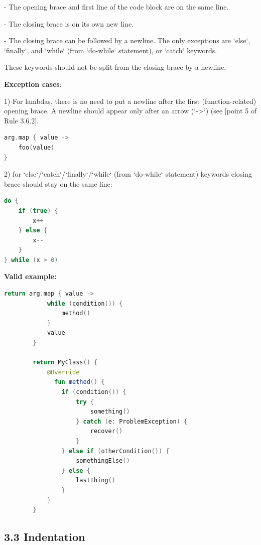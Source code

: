 - The opening brace and first line of the code block are on the same line.

- The closing brace is on its own new line.

- The closing brace can be followed by a newline. The only exceptions are `else`, `finally`, and `while` (from `do-while` statement), or `catch` keywords.

These keywords should not be split from the closing brace by a newline.



\textbf{Exception cases}:



1) For lambdas, there is no need to put a newline after the first (function-related) opening brace. A newline should appear only after an arrow (`->`) (see [point 5 of Rule 3.6.2].



\begin{lstlisting}[language=Kotlin]
arg.map { value ->
    foo(value)
}
\end{lstlisting}


2) for `else`/`catch`/`finally`/`while` (from `do-while` statement) keywords closing brace should stay on the same line:

\begin{lstlisting}[language=Kotlin]
do {
    if (true) {
        x++
    } else {
        x--
    }
} while (x > 0)
\end{lstlisting}


\textbf{Valid example:}



\begin{lstlisting}[language=Kotlin]
        return arg.map { value ->
            while (condition()) {
                method()
            }
            value
        }

        return MyClass() {
            @Override
              fun method() {
                if (condition()) {
                    try {
                        something()
                    } catch (e: ProblemException) {
                        recover()
                    }
                } else if (otherCondition()) {
                    somethingElse()
                } else {
                    lastThing()
                }
            }
        }
\end{lstlisting}


\subsection*{\textbf{3.3 Indentation}}

